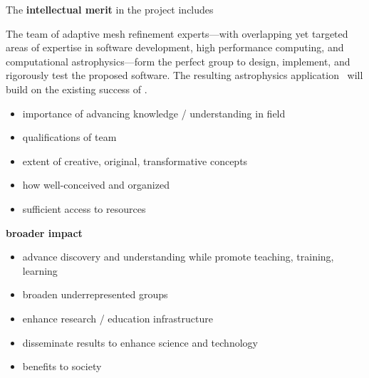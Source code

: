 \documentclass[11pt,letterpaper]{article}
\begin{document}

The \textbf{intellectual merit} in the project includes 
%

The team of adaptive mesh refinement experts---with overlapping yet
targeted areas of expertise in software development, high performance
computing, and computational astrophysics---form the perfect group to
design, implement, and rigorously test the proposed software.  The
resulting astrophysics application \enzoii\ will build on the existing
success of \enzo.


\begin{itemize}
\item importance of advancing knowledge / understanding in field
\item qualifications of team
\item extent of creative, original, transformative concepts
\item how well-conceived and organized
\item sufficient access to resources
\end{itemize}

\textbf{broader impact}

\begin{itemize}
\item advance discovery and understanding while promote teaching, training, learning
\item broaden underrepresented groups
\item enhance research / education infrastructure
\item disseminate results to enhance science and technology
\item benefits to society
\end{itemize}
\end{document}
